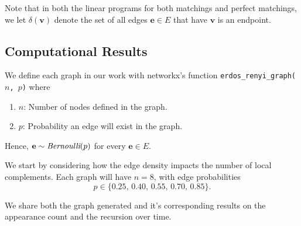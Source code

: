 \documentclass[12pt]{report} %
\begin{document}
Note that in both the linear programs for both matchings and perfect matchings, we let $\delta(\mathbf{v})$ denote the set of all edges $\mathbf{e} \in E$ that have $\mathbf{v}$ is an endpoint. 

\subsection*{Computational Results}

We define each graph in our work with networkx's function \texttt{erdos\_renyi\_graph($n$, $p$)} where 
\begin{enumerate}[label=(\roman*), font=\itshape]
    \item $n$: Number of nodes defined in the graph. 
    \item $p$: Probability an edge will exist in the graph.
\end{enumerate}
Hence, $\mathbf{e} \sim \emph{Bernoulli}(p)$ for every $\mathbf{e} \in E$. 

\vspace{1em}

We start by considering how the edge density impacts the number of local complements. Each graph will have $n=8$, with edge probabilities
\[
p\in\{0.25,\,0.40,\,0.55,\,0.70,\,0.85\}.
\]

We share both the graph generated and it's corresponding results on the appearance count and the recursion over time. 

\newpage 
\end{document}
